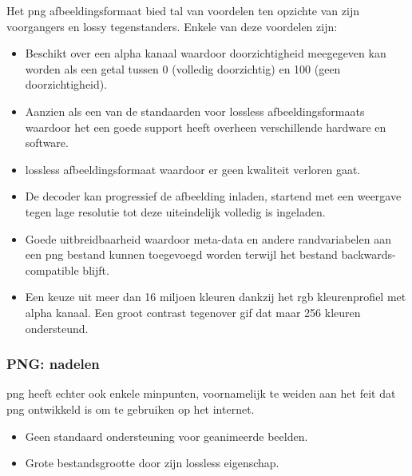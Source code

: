Het \gls{png} \gls{afbeeldingsformaat} bied tal van voordelen ten opzichte van zijn voorgangers en \gls{lossy} tegenstanders. Enkele van deze voordelen zijn:

\begin{itemize}
	\item Beschikt over een alpha kanaal waardoor doorzichtigheid meegegeven kan worden als een getal tussen 0 (volledig doorzichtig) en 100 (geen doorzichtigheid).
	
	\item Aanzien als een van de standaarden voor \gls{lossless} \glspl{afbeeldingsformaat} waardoor het een goede support heeft overheen verschillende hardware en software.
	
	\item \Gls{lossless} \gls{afbeeldingsformaat} waardoor er geen kwaliteit verloren gaat.
	
	\item De  \gls{decoder} kan progressief de afbeelding inladen, startend met een weergave tegen lage resolutie tot deze uiteindelijk volledig is ingeladen.
	
	\item Goede uitbreidbaarheid waardoor \gls{meta-data} en andere randvariabelen aan een \gls{png} bestand kunnen toegevoegd worden terwijl het bestand  \gls{backwards-compatible} blijft.
	
	\item Een keuze uit meer dan 16 miljoen kleuren dankzij het \gls{rgb} kleurenprofiel met alpha kanaal. Een groot contrast tegenover \gls{gif} dat maar 256 kleuren ondersteund. 
\end{itemize}

\subsubsection{PNG: nadelen}
\label{sec:afbeeldingscompressie-png-nadelen}

\Gls{png} heeft echter ook enkele minpunten, voornamelijk te weiden aan het feit dat \gls{png} ontwikkeld is om te gebruiken op het internet.

\begin{itemize}
	\item Geen standaard ondersteuning voor geanimeerde beelden.
	
	\item Grote bestandsgrootte door zijn \gls{lossless} eigenschap.
\end{itemize}

